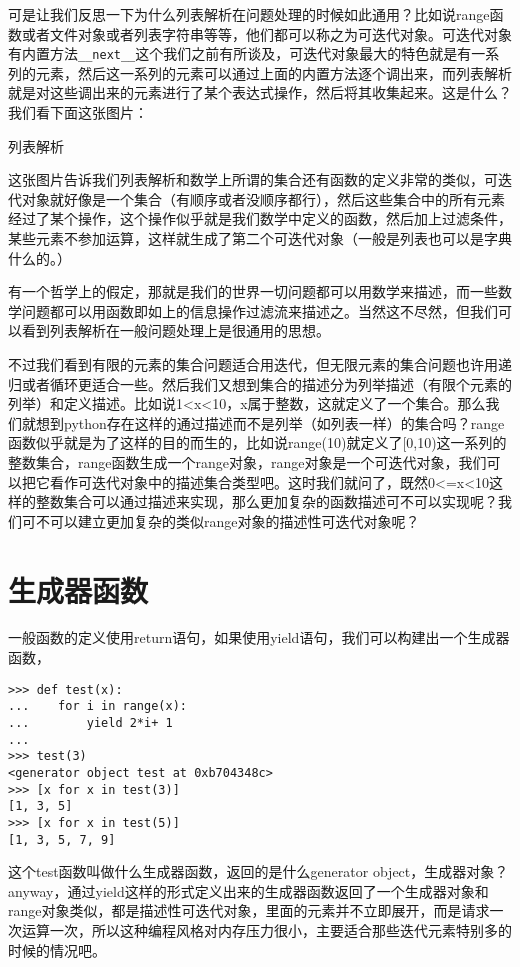 \documentclass[12pt,oneside]{book}
\begin{document}
\begin{common-format}
可是让我们反思一下为什么列表解析在问题处理的时候如此通用？比如说range函数或者文件对象或者列表字符串等等，他们都可以称之为可迭代对象。可迭代对象有内置方法\verb+__next__+这个我们之前有所谈及，可迭代对象最大的特色就是有一系列的元素，然后这一系列的元素可以通过上面的内置方法逐个调出来，而列表解析就是对这些调出来的元素进行了某个表达式操作，然后将其收集起来。这是什么？我们看下面这张图片：
\begin{fig}{列表解析}
\caption{列表解析}
\label{fig:列表解析}
\end{fig}

这张图片告诉我们列表解析和数学上所谓的集合还有函数的定义非常的类似，可迭代对象就好像是一个集合（有顺序或者没顺序都行），然后这些集合中的所有元素经过了某个操作，这个操作似乎就是我们数学中定义的函数，然后加上过滤条件，某些元素不参加运算，这样就生成了第二个可迭代对象（一般是列表也可以是字典什么的。）

有一个哲学上的假定，那就是我们的世界一切问题都可以用数学来描述，而一些数学问题都可以用函数即如上的信息操作过滤流来描述之。当然这不尽然，但我们可以看到列表解析在一般问题处理上是很通用的思想。

不过我们看到有限的元素的集合问题适合用迭代，但无限元素的集合问题也许用递归或者循环更适合一些。然后我们又想到集合的描述分为列举描述（有限个元素的列举）和定义描述。比如说1<x<10，x属于整数，这就定义了一个集合。那么我们就想到python存在这样的通过描述而不是列举（如列表一样）的集合吗？range函数似乎就是为了这样的目的而生的，比如说range(10)就定义了[0,10)这一系列的整数集合，range函数生成一个range对象，range对象是一个可迭代对象，我们可以把它看作可迭代对象中的描述集合类型吧。这时我们就问了，既然0<=x<10这样的整数集合可以通过描述来实现，那么更加复杂的函数描述可不可以实现呢？我们可不可以建立更加复杂的类似range对象的描述性可迭代对象呢？

\section{生成器函数}
一般函数的定义使用return语句，如果使用yield语句，我们可以构建出一个生成器函数，
\begin{Verbatim}
>>> def test(x):
...    for i in range(x):
...        yield 2*i+ 1
... 
>>> test(3)
<generator object test at 0xb704348c>
>>> [x for x in test(3)]
[1, 3, 5]
>>> [x for x in test(5)]
[1, 3, 5, 7, 9]
\end{Verbatim}

这个test函数叫做什么生成器函数，返回的是什么generator object，生成器对象？anyway，通过yield这样的形式定义出来的生成器函数返回了一个生成器对象和range对象类似，都是描述性可迭代对象，里面的元素并不立即展开，而是请求一次运算一次，所以这种编程风格对内存压力很小，主要适合那些迭代元素特别多的时候的情况吧。


\end{common-format}
\end{document}
